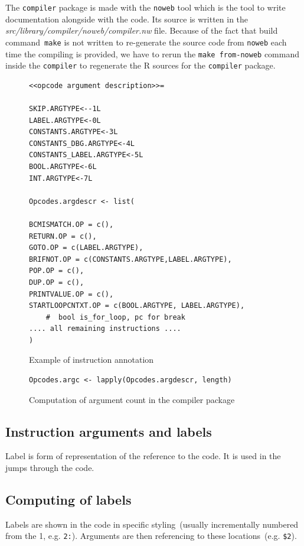 \documentclass[thesis=M,english]{FITthesis}[2018/10/20]
\newcommand{\code}[1]{\texttt{#1}}
\begin{document}
The \code{compiler} package is made with the \code{noweb} tool which is the tool to write documentation alongside with the code. Its source is written in the \textit{src/library/compiler/noweb/compiler.nw} file. Because of the fact that build command~\code{make} is not written to re-generate the source code from \code{noweb} each time the compiling is provided, we have to rerun the \code{make from-noweb} command inside the \code{compiler} to regenerate the R sources for the \code{compiler} package.

\begin{figure}[!h]
\begin{lstlisting}
<<opcode argument description>>=

SKIP.ARGTYPE<--1L
LABEL.ARGTYPE<-0L
CONSTANTS.ARGTYPE<-3L
CONSTANTS_DBG.ARGTYPE<-4L
CONSTANTS_LABEL.ARGTYPE<-5L
BOOL.ARGTYPE<-6L
INT.ARGTYPE<-7L

Opcodes.argdescr <- list(

BCMISMATCH.OP = c(),
RETURN.OP = c(),
GOTO.OP = c(LABEL.ARGTYPE),
BRIFNOT.OP = c(CONSTANTS.ARGTYPE,LABEL.ARGTYPE),
POP.OP = c(),
DUP.OP = c(),
PRINTVALUE.OP = c(),
STARTLOOPCNTXT.OP = c(BOOL.ARGTYPE, LABEL.ARGTYPE),
    #  bool is_for_loop, pc for break
.... all remaining instructions ....
)
\end{lstlisting}
	\caption{Example of instruction annotation}\label{fig:computation-of-argdescr}
\end{figure}

\begin{figure}[!h]
\begin{lstlisting}
Opcodes.argc <- lapply(Opcodes.argdescr, length)
\end{lstlisting}
	\caption{Computation of argument count in the compiler package}\label{fig:computation-of-argc}
\end{figure}

\subsection{Instruction arguments and labels}\label{instruction-arguments-labels}

Label is form of representation of the reference to the code. It is used in the jumps through the code. 

\subsection{Computing of labels}

Labels are shown in the code in specific styling~(usually incrementally numbered from the 1, e.g. \code{2:}). Arguments are then referencing to these locations~(e.g. \code{{\$}2}). 
\end{document}

